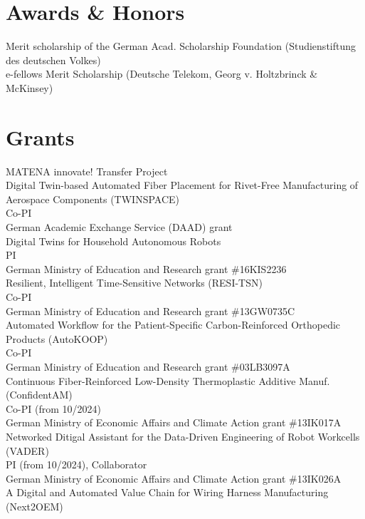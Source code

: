 \documentclass[11pt]{article} %
\begin{document}
\section*{Awards \& Honors}

Merit scholarship of the German Acad. Scholarship Foundation (Studienstiftung des deutschen Volkes)\\
e-fellows Merit Scholarship (Deutsche Telekom, Georg v. Holtzbrinck \& McKinsey)

\section*{Grants}
MATENA innovate! Transfer Project\\
Digital Twin-based Automated Fiber Placement for Rivet-Free Manufacturing of Aerospace Components (TWINSPACE)\\
Co-PI\\
German Academic Exchange Service (DAAD) grant\\
Digital Twins for Household Autonomous Robots\\
PI\\
German Ministry of Education and Research grant \#16KIS2236\\
Resilient, Intelligent Time-Sensitive Networks (RESI-TSN)\\
Co-PI\\
German Ministry of Education and Research grant \#13GW0735C\\
Automated Workflow for the Patient-Specific Carbon-Reinforced Orthopedic Products (AutoKOOP)\\
Co-PI\\
German Ministry of Education and Research grant \#03LB3097A\\
Continuous Fiber-Reinforced Low-Density Thermoplastic Additive Manuf. (ConfidentAM)\\
Co-PI (from 10/2024)\\
German Ministry of Economic Affairs and Climate Action grant \#13IK017A\\
Networked Ditigal Assistant for the Data-Driven Engineering of Robot Workcells (VADER)\\
PI (from 10/2024), Collaborator\\
German Ministry of Economic Affairs and Climate Action grant \#13IK026A\\
A Digital and Automated Value Chain for Wiring Harness Manufacturing (Next2OEM)\\
\end{document}
